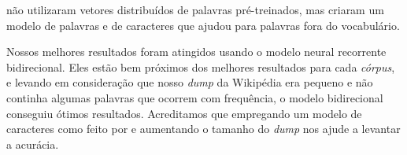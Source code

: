  não utilizaram vetores distribuídos de palavras pré-treinados, mas criaram um modelo de palavras e de caracteres que ajudou para palavras fora do vocabulário. 

Nossos melhores resultados foram atingidos usando o modelo neural recorrente bidirecional. Eles estão bem próximos dos melhores resultados para cada \textit{córpus}, e levando em consideração que nosso \textit{dump} da Wikipédia era pequeno e não continha algumas palavras que ocorrem com frequência, o modelo bidirecional conseguiu ótimos resultados. Acreditamos que empregando um modelo de caracteres como feito por  e aumentando o tamanho do \textit{dump} nos ajude a levantar a acurácia. 